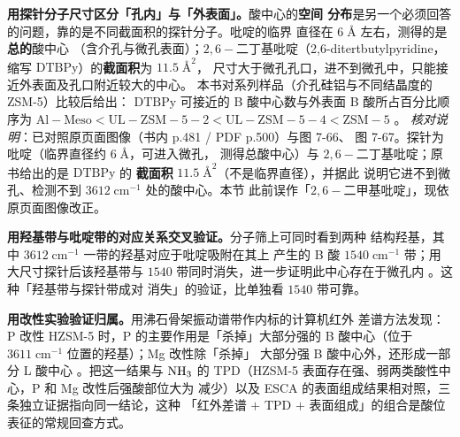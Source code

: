 \begin{crosscheck}
\textbf{用探针分子尺寸区分「孔内」与「外表面」。}酸中心的\textbf{空间
分布}是另一个必须回答的问题，靠的是不同截面积的探针分子。吡啶的临界
直径在 $6\;\mathrm{\text{\AA}}$ 左右，测得的是\textbf{总的}酸中心
（含介孔与微孔表面）；$2,6-$二丁基吡啶（2,6-ditertbutylpyridine，缩写
$\mathrm{DTBPy}$）的\textbf{截面积}为 $11.5\;\mathrm{\text{\AA}^{2}}$，
尺寸大于微孔孔口，进不到微孔中，只能接近外表面及孔口附近较大的中心。
本书对系列样品（介孔硅铝与不同结晶度的 ZSM-5）比较后给出：
$\mathrm{DTBPy}$ 可接近的 B 酸中心数与外表面 B 酸所占百分比顺序为
$\mathrm{Al{-}Meso}<\mathrm{UL{-}ZSM{-}5{-}2}
<\mathrm{UL{-}ZSM{-}5{-}4}<\mathrm{ZSM{-}5}$
。
\emph{核对说明}：已对照原页面图像（书内 p.481 / PDF p.500）与图 7-66、
图 7-67。探针为吡啶（临界直径约 $6\;\mathrm{\text{\AA}}$，可进入微孔，
测得总酸中心）与 $2,6-$二丁基吡啶；原书给出的是 $\mathrm{DTBPy}$ 的
\textbf{截面积} $11.5\;\mathrm{\text{\AA}^{2}}$（不是临界直径），并据此
说明它进不到微孔、检测不到 $3612\;\mathrm{cm^{-1}}$ 处的酸中心。本节
此前误作「$2,6-$二甲基吡啶」，现依原页面图像改正。

\textbf{用羟基带与吡啶带的对应关系交叉验证。}分子筛上可同时看到两种
结构羟基，其中 $3612\;\mathrm{cm^{-1}}$ 一带的羟基对应于吡啶吸附在其上
产生的 B 酸 $1540\;\mathrm{cm^{-1}}$ 带；用大尺寸探针后该羟基带与
$1540$ 带同时消失，进一步证明此中心存在于微孔内
。这种「羟基带与探针带成对
消失」的验证，比单独看 $1540$ 带可靠。

\textbf{用改性实验验证归属。}用沸石骨架振动谱带作内标的计算机红外
差谱方法发现：P 改性 HZSM-5 时，P 的主要作用是「杀掉」大部分强的
B 酸中心（位于 $3611\;\mathrm{cm^{-1}}$ 位置的羟基）；Mg 改性除「杀掉」
大部分强 B 酸中心外，还形成一部分 L 酸中心
。把这一结果与 $\ce{NH3}$ 的
TPD（HZSM-5 表面存在强、弱两类酸性中心，P 和 Mg 改性后强酸部位大为
减少）以及 ESCA 的表面组成结果相对照，三条独立证据指向同一结论，这种
「红外差谱 $+$ TPD $+$ 表面组成」的组合是酸位表征的常规回查方式。


\end{crosscheck}
